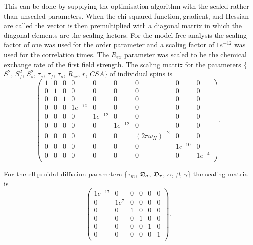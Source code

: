 \begin{htmlonly}
\begin{htmlonly}
This can be done by supplying the optimisation algorithm with the scaled rather than unscaled parameters.  When the chi-squared function, gradient, and Hessian are called the vector is then premultiplied with a diagonal matrix in which the diagonal elements are the scaling factors.  For the model-free analysis the scaling factor of one was used for the order parameter and a scaling factor of $1e^{-12}$ was used for the correlation times.  The $R_{ex}$ parameter was scaled to be the chemical exchange rate of the first field strength.  The scaling matrix for the parameters \{$S^2$, $S^2_f$, $S^2_s$, $\tau_e$, $\tau_f$, $\tau_s$, $R_{ex}$, $r$, $CSA$\} of individual spins is
\begin{equation}
    \begin{pmatrix}
        1 &  0 &  0 &  0 &  0 &  0 &  0 &  0 &  0 \\
        0 &  1 &  0 &  0 &  0 &  0 &  0 &  0 &  0 \\
        0 &  0 &  1 &  0 &  0 &  0 &  0 &  0 &  0 \\
        0 &  0 &  0 &  1e^{-12} &  0 &  0 &  0 &  0 &  0 \\
        0 &  0 &  0 &  0 &  1e^{-12} &  0 &  0 &  0 &  0 \\
        0 &  0 &  0 &  0 &  0 &  1e^{-12} &  0 &  0 &  0 \\
        0 &  0 &  0 &  0 &  0 &  0 &  (2\pi \omega_H)^{-2} &  0 &  0 \\
        0 &  0 &  0 &  0 &  0 &  0 &  0 &  1e^{-10} &  0 \\
        0 &  0 &  0 &  0 &  0 &  0 &  0 &  0 &  1e^{-4} \\
    \end{pmatrix}.
\end{equation}

\noindent  For the ellipsoidal diffusion parameters \{$\tau_m$, $\mathfrak{D}_a$, $\mathfrak{D}_r$, $\alpha$, $\beta$, $\gamma$\} the scaling matrix is
\begin{equation}
    \begin{pmatrix}
        1e^{-12} &  0 &  0 &  0 &  0 &  0 \\
        0 &  1e^7 &  0 &  0 &  0 &  0 \\
        0 &  0 &  1 &  0 &  0 &  0 \\
        0 &  0 &  0 &  1 &  0 &  0 \\
        0 &  0 &  0 &  0 &  1 &  0 \\
        0 &  0 &  0 &  0 &  0 &  1 \\
    \end{pmatrix}.
\end{equation}


\end{htmlonly}
\end{htmlonly}
